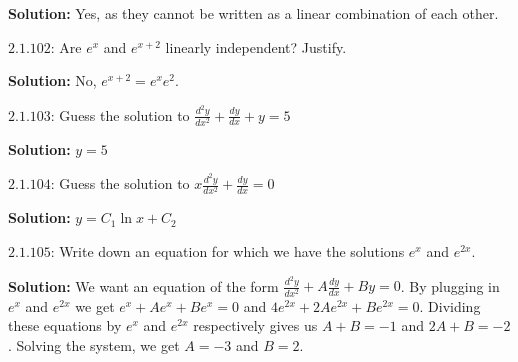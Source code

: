 \documentclass{article}
\begin{document}
\textbf{Solution:} Yes, as they cannot be written as a linear combination of each other.

$2.1.102$: Are $e^x$ and $e^{x+2}$ linearly independent? Justify.

\textbf{Solution:} No, $e^{x+2} = e^xe^2$.

$2.1.103$: Guess the solution to $\frac{d^2y}{dx^2} + \frac{dy}{dx} + y = 5$

\textbf{Solution:} $y = 5$

$2.1.104$: Guess the solution to $x \frac{d^2y}{dx^2} + \frac{dy}{dx} = 0$

\textbf{Solution:} $y = C_1 \ln x + C_2$

$2.1.105$: Write down an equation for which we have the solutions $e^x$ and $e^{2x}$.

\textbf{Solution:} We want an equation of the form $\frac{d^2y}{dx^2} + A \frac{dy}{dx} + By = 0$. By plugging in $e^x$ and $e^{2x}$ we get $e^x + Ae^x + Be^x = 0$ and $4e^{2x} + 2A e^{2x} + B e^{2x} = 0$. Dividing these equations by $e^x$ and $e^{2x}$ respectively gives us $A + B = -1$ and $2A + B = -2$. Solving the system, we get $A = -3$ and $B = 2$.      
\end{document}
